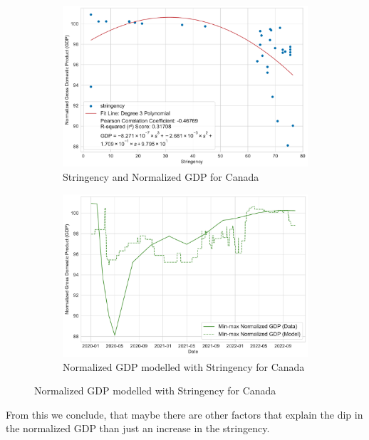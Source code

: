 \documentclass[tikz,fleqn,12pt]{wlscirep}
\begin{document}
\begin{figure}[htbp!]
  \begin{subfigure}[t]{0.48\textwidth}
    \centering
    \includegraphics[width=\linewidth]{images/stringency_vs_gdp_CAN.pdf}
    \caption{Stringency and Normalized GDP for Canada}
  \end{subfigure}
  \label{fig:stringency_vs_gdp_CAN}
  \hfill
  \begin{subfigure}[t]{0.48\textwidth}
    \centering
    \includegraphics[width=\linewidth]{images/gdp_modelled_with_stringency_CAN.pdf}
    \caption{Normalized GDP modelled with Stringency for Canada}
  \end{subfigure}
  \label{fig:gdp_modelled_with_stringency_CAN}
\end{figure}
From this we conclude, that maybe there are other factors that explain the dip in the normalized GDP than just an increase in the stringency.
\end{document}
